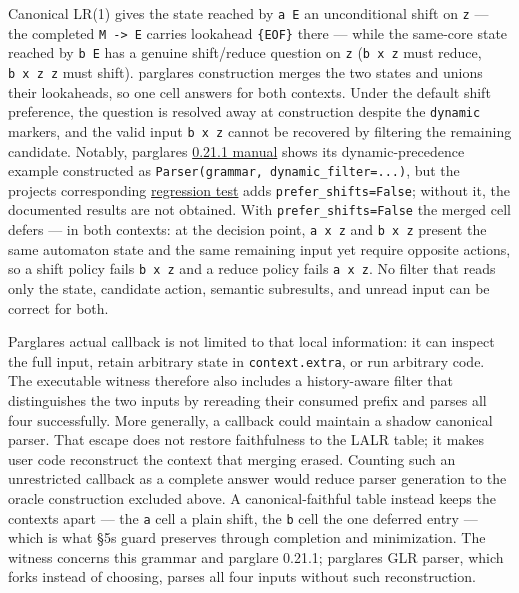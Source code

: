 \documentclass[
  10pt,
]{article}
\begin{document}
Canonical LR(1) gives the state reached by \texttt{a\ E} an
unconditional shift on \texttt{z} --- the completed
\texttt{M\ -\textgreater{}\ E} carries lookahead \texttt{\{EOF\}} there
--- while the same-core state reached by \texttt{b\ E} has a genuine
shift/reduce question on \texttt{z} (\texttt{b\ x\ z} must reduce,
\texttt{b\ x\ z\ z} must shift). parglare\textquotesingle s construction
merges the two states and unions their lookaheads, so one cell answers
for both contexts. Under the default shift preference, the question is
resolved away at construction despite the \texttt{dynamic} markers, and
the valid input \texttt{b\ x\ z} cannot be recovered by filtering the
remaining candidate. Notably, parglare\textquotesingle s
\href{https://github.com/igordejanovic/parglare/blob/0.21.1/docs/disambiguation.md\#dynamic-disambiguation-filter}{0.21.1
manual} shows its dynamic-precedence example constructed as
\texttt{Parser(grammar,\ dynamic\_filter=...)}, but the
project\textquotesingle s corresponding
\href{https://github.com/igordejanovic/parglare/blob/0.21.1/tests/func/parsing/disambiguation/test_dynamic_disambiguation_filters.py}{regression
test} adds \texttt{prefer\_shifts=False}; without it, the documented
results are not obtained. With \texttt{prefer\_shifts=False} the merged
cell defers --- in both contexts: at the decision point,
\texttt{a\ x\ z} and \texttt{b\ x\ z} present the same automaton state
and the same remaining input yet require opposite actions, so a shift
policy fails \texttt{b\ x\ z} and a reduce policy fails
\texttt{a\ x\ z}. No filter that reads only the state, candidate action,
semantic subresults, and unread input can be correct for both.

Parglare\textquotesingle s actual callback is not limited to that local
information: it can inspect the full input, retain arbitrary state in
\texttt{context.extra}, or run arbitrary code. The executable witness
therefore also includes a history-aware filter that distinguishes the
two inputs by rereading their consumed prefix and parses all four
successfully. More generally, a callback could maintain a shadow
canonical parser. That escape does not restore faithfulness to the LALR
table; it makes user code reconstruct the context that merging erased.
Counting such an unrestricted callback as a complete answer would reduce
parser generation to the oracle construction excluded above. A
canonical-faithful table instead keeps the contexts apart --- the
\texttt{a} cell a plain shift, the \texttt{b} cell the one deferred
entry --- which is what §5\textquotesingle s guard preserves through
completion and minimization. The witness concerns this grammar and
parglare 0.21.1; parglare\textquotesingle s GLR parser, which forks
instead of choosing, parses all four inputs without such reconstruction.
\end{document}
